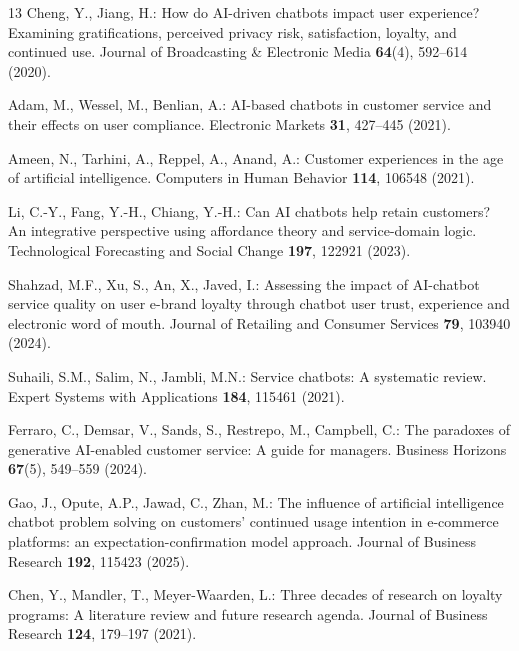 \documentclass[runningheads]{llncs}
\begin{document}
%
%
\begin{thebibliography}{13}
Cheng, Y., Jiang, H.: How do AI-driven chatbots impact user experience? Examining gratifications, perceived privacy risk, satisfaction, loyalty, and continued use. Journal of Broadcasting \& Electronic Media \textbf{64}(4), 592--614 (2020). 

Adam, M., Wessel, M., Benlian, A.: AI-based chatbots in customer service and their effects on user compliance. Electronic Markets \textbf{31}, 427--445 (2021). 

Ameen, N., Tarhini, A., Reppel, A., Anand, A.: Customer experiences in the age of artificial intelligence. Computers in Human Behavior \textbf{114}, 106548 (2021). 

Li, C.-Y., Fang, Y.-H., Chiang, Y.-H.: Can AI chatbots help retain customers? An integrative perspective using affordance theory and service-domain logic. Technological Forecasting and Social Change \textbf{197}, 122921 (2023). 

Shahzad, M.F., Xu, S., An, X., Javed, I.: Assessing the impact of AI-chatbot service quality on user e-brand loyalty through chatbot user trust, experience and electronic word of mouth. Journal of Retailing and Consumer Services \textbf{79}, 103940 (2024). 

Suhaili, S.M., Salim, N., Jambli, M.N.: Service chatbots: A systematic review. Expert Systems with Applications \textbf{184}, 115461 (2021). 

Ferraro, C., Demsar, V., Sands, S., Restrepo, M., Campbell, C.: The paradoxes of generative AI-enabled customer service: A guide for managers. Business Horizons \textbf{67}(5), 549--559 (2024). 

Gao, J., Opute, A.P., Jawad, C., Zhan, M.: The influence of artificial intelligence chatbot problem solving on customers' continued usage intention in e-commerce platforms: an expectation-confirmation model approach. Journal of Business Research \textbf{192}, 115423 (2025). 

Chen, Y., Mandler, T., Meyer-Waarden, L.: Three decades of research on loyalty programs: A literature review and future research agenda. Journal of Business Research \textbf{124}, 179--197 (2021). 


\end{thebibliography}
\end{document}
